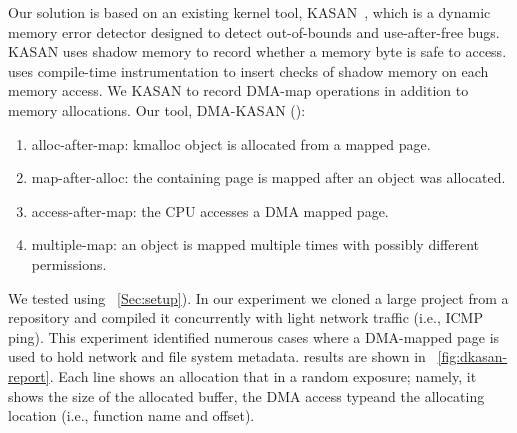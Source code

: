 Our solution is based on an existing kernel tool, KASAN~\cite{kasan}, which is a dynamic memory error detector designed to detect out-of-bounds and use-after-free bugs. KASAN uses shadow memory to record whether a memory byte is safe to access. \DIFdelbegin {}\DIFdelend \DIFaddbegin {}\DIFaddend uses compile-time instrumentation to insert checks of shadow memory on each memory access. 
We \DIFdelbegin {}\DIFdelend \DIFaddbegin {}\DIFaddend KASAN to record DMA-map operations in addition to memory allocations. Our tool, \DIFdelbegin {}\DIFdelend \DIFaddbegin {}\DIFaddend DMA-KASAN (\dkasan)\DIFdelbegin {}\DIFdelend \DIFaddbegin {}\DIFaddend : 
\begin{enumerate}
    \item alloc-after-map:  kmalloc object is allocated from a mapped page.
    \item map-after-alloc:  the containing page is mapped after an object was allocated.
    \item access-after-map: the CPU accesses a DMA mapped page.
    \item multiple-map: an object is mapped multiple times with possibly different permissions.
\end{enumerate}
We tested \dkasan using \DIFdelbegin {}\DIFdelend \DIFaddbegin {}\DIFaddend ~\ref{Sec:setup}).
In our experiment we cloned a large project from a \DIFdelbegin {}\DIFdelend \DIFaddbegin {}\DIFaddend repository and compiled it concurrently with light network traffic (i.e., ICMP ping). This experiment \DIFdelbegin {}\DIFdelend identified numerous cases where a DMA-mapped page is used to hold network and file system metadata. \DIFdelbegin {}\DIFdelend \DIFaddbegin {}\DIFaddend results are shown in \DIFdelbegin {}\DIFdelend \DIFaddbegin {}\DIFaddend ~\ref{fig:dkasan-report}. Each line shows an allocation that \DIFdelbegin {}\DIFdelend \DIFaddbegin {}\DIFaddend in a random exposure; namely, it shows the size of the allocated buffer, the DMA access type\DIFaddbegin \DIFadd{, }\DIFaddend and the allocating location (i.e., function name and offset).

